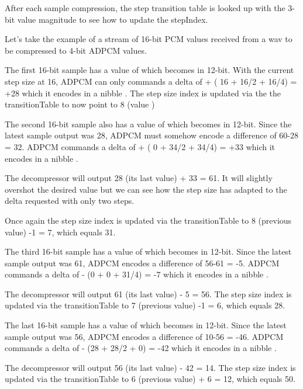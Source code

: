  

After each sample compression, the step transition table is looked up with the 3-bit value magnitude to see how to update the stepIndex.

 

Let's take the example of a stream of 16-bit PCM values received from a wav to be compressed to 4-bit ADPCM values.



The first 16-bit sample has a value of  which becomes  in 12-bit. With the current step size at 16, ADPCM can only commands a delta of + ( 16 + 16/2 + 16/4) = +28 which it encodes in a nibble . The step size index is updated via the the transitionTable to now point to 8 (value )

The second 16-bit sample also has a value of  which becomes  in 12-bit. Since the latest sample output was 28, ADPCM must somehow encode a difference of 60-28 = 32. ADPCM commands a delta of + ( 0 + 34/2 + 34/4) = +33 which it encodes in a nibble . 

The decompressor will output 28 (its last value) + 33 = 61. It will slightly overshot the desired value but we can see how the step size has adapted to the delta requested with only two steps. 

Once again the step size index is updated via the transitionTable to 8 (previous value) -1 = 7, which equals 31.

The third 16-bit sample has a value of  which becomes  in 12-bit. Since the latest sample output was 61, ADPCM encodes a difference of 56-61 = -5. ADPCM commands a delta of - (0 + 0 + 31/4) = -7 which it encodes in a nibble . 

The decompressor will output 61 (its last value) - 5 = 56. The step size index is updated via the transitionTable to 7 (previous value) -1 = 6, which equals 28.

The last 16-bit sample has a value of  which becomes  in 12-bit. Since the latest sample output was 56, ADPCM encodes a difference of 10-56 = -46. ADPCM commands a delta of - (28 + 28/2 + 0) = -42 which it encodes in a nibble . 

The decompressor will output 56 (its last value) - 42 = 14. The step size index is updated via the transitionTable to 6 (previous value) + 6 = 12, which equals 50.

